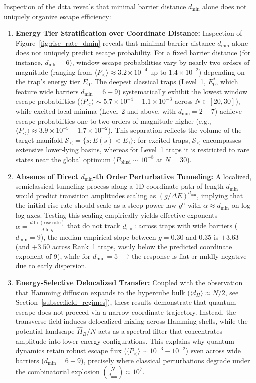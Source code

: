 \documentclass[10pt,twocolumn,a4paper]{article}
\begin{document}
Inspection of the data reveals that minimal barrier distance $d_{\min}$ alone does not uniquely organize escape efficiency:
\begin{enumerate}
    \item \textbf{Energy Tier Stratification over Coordinate Distance:} 
    Inspection of Figure~\ref{fig:rise_rate_dmin} reveals that minimal barrier distance $d_{\min}$ alone does not uniquely predict escape probability. For a fixed barrier distance (for instance, $d_{\min} = 6$), window escape probabilities vary by nearly two orders of magnitude (ranging from $\langle P_< \rangle \approx 3.2 \times 10^{-4}$ up to $1.4 \times 10^{-2}$) depending on the trap's energy tier $E_0$. The deepest classical traps (Level~1, $E_0^*$, which feature wide barriers $d_{\min} = 6 - 9$) systematically exhibit the lowest window escape probabilities ($\langle P_< \rangle \sim 5.7 \times 10^{-4} - 1.1 \times 10^{-3}$ across $N \in [20, 30]$), while excited local minima (Level~2 and above, with $d_{\min} = 2 - 7$) achieve escape probabilities one to two orders of magnitude higher (e.g., $\langle P_< \rangle \approx 3.9 \times 10^{-3} - 1.7 \times 10^{-2}$). This separation reflects the volume of the target manifold $\mathcal{S}_< = \{s : E(s) < E_0\}$: for excited traps, $\mathcal{S}_<$ encompasses extensive lower-lying basins, whereas for Level~1 traps it is restricted to rare states near the global optimum ($P_{\mathrm{blind}} \sim 10^{-8}$ at $N = 30$).
    
    \item \textbf{Absence of Direct $d_{\min}$-th Order Perturbative Tunneling:} 
    A localized, semiclassical tunneling process along a 1D coordinate path of length $d_{\min}$ would predict transition amplitudes scaling as $(g / \Delta E)^{d_{\min}}$, implying that the initial rise rate should scale as a steep power law $g^{\alpha}$ with $\alpha \approx d_{\min}$ on log-log axes. Testing this scaling empirically yields effective exponents $\alpha = \frac{d \ln(\mathrm{rise~rate})}{d \ln g}$ that do not track $d_{\min}$: across traps with wide barriers ($d_{\min} = 9$), the median empirical slope between $g = 0.30$ and $0.35$ is $+3.63$ (and $+3.50$ across Rank~1 traps, vastly below the predicted coordinate exponent of $9$), while for $d_{\min} = 5 - 7$ the response is flat or mildly negative due to early dispersion.
    
    \item \textbf{Energy-Selective Delocalized Transfer:} 
    Coupled with the observation that Hamming diffusion expands to the hypercube bulk ($\langle d_H \rangle \approx N/2$, see Section~\ref{subsec:field_regimes}), these results demonstrate that quantum escape does not proceed via a narrow coordinate trajectory. Instead, the transverse field induces delocalized mixing across Hamming shells, while the potential landscape $\hat{H}_B / N$ acts as a spectral filter that concentrates amplitude into lower-energy configurations. This explains why quantum dynamics retain robust escape flux ($\langle P_< \rangle \sim 10^{-3} - 10^{-2}$) even across wide barriers ($d_{\min} = 6 - 9$), precisely where classical perturbations degrade under the combinatorial explosion $\binom{N}{d_{\min}} \approx 10^7$.
\end{enumerate}
\end{document}
